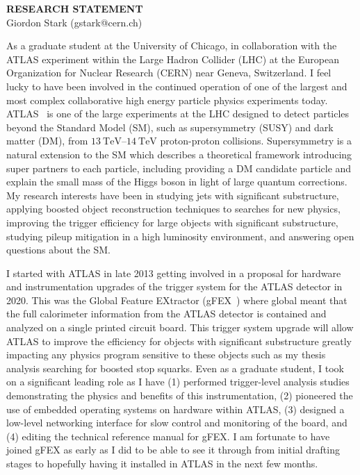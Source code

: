 \documentclass[letterpaper, 10pt]{article}
\begin{document}
\thispagestyle{fancy}
\lhead{}
\rhead{}
\renewcommand{\headrulewidth}{0pt}
\renewcommand{\footrulewidth}{0pt}

\pagestyle{fancy}
\lhead{\textcolor{gray}{\it Giordon Stark}}
\rhead{\textcolor{gray}{\thepage/\totalpages{}}}

\begin{center}
{\LARGE \bf RESEARCH STATEMENT}\\
\vspace*{0.1cm}
{\normalsize Giordon Stark (gstark@cern.ch)}
\end{center}

As a graduate student at the University of Chicago, in collaboration with the ATLAS experiment within the Large Hadron Collider (LHC) at the European Organization for Nuclear Research (CERN) near Geneva, Switzerland. I feel lucky to have been involved in the continued operation of one of the largest and most complex collaborative high energy particle physics experiments today. ATLAS~ is one of the large experiments at the LHC designed to detect particles beyond the Standard Model (SM), such as supersymmetry (SUSY) and dark matter (DM), from $\SIrange{13}{14}{\tera\electronvolt}$ proton-proton collisions. Supersymmetry is a natural extension to the SM which describes a theoretical framework introducing super partners to each particle, including providing a DM candidate particle and explain the small mass of the Higgs boson in light of large quantum corrections. My research interests have been in studying jets with significant substructure, applying boosted object reconstruction techniques to searches for new physics, improving the trigger efficiency for large objects with significant substructure, studying pileup mitigation in a high luminosity environment, and answering open questions about the SM.

I started with ATLAS in late 2013 getting involved in a proposal for hardware and instrumentation upgrades of the trigger system for the ATLAS detector in 2020. This was the Global Feature EXtractor (gFEX~) where global meant that the full calorimeter information from the ATLAS detector is contained and analyzed on a single printed circuit board. This trigger system upgrade will allow ATLAS to improve the efficiency for objects with significant substructure greatly impacting any physics program sensitive to these objects such as my thesis analysis searching for boosted stop squarks. Even as a graduate student, I took on a significant leading role as I have (1) performed trigger-level analysis studies demonstrating the physics and benefits of this instrumentation, (2) pioneered the use of embedded operating systems on hardware within ATLAS, (3) designed a low-level networking interface for slow control and monitoring of the board, and (4) editing the technical reference manual for gFEX. I am fortunate to have joined gFEX as early as I did to be able to see it through from initial drafting stages to hopefully having it installed in ATLAS in the next few months.
\end{document}
